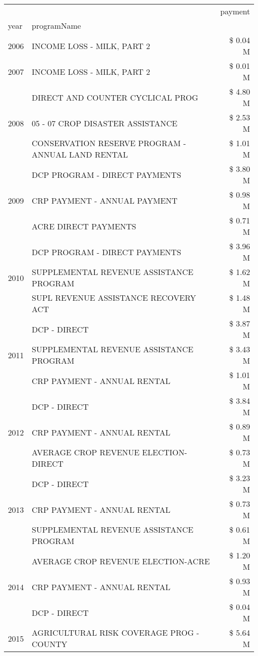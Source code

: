 \begin{tabular}{llr}
\toprule
 &  & payment \\
year & programName &  \\
\midrule
2006 & INCOME LOSS - MILK, PART 2 & \$ 0.04 M \\
\cline{1-3}
2007 & INCOME LOSS - MILK, PART 2 & \$ 0.01 M \\
\cline{1-3}
\multirow[t]{3}{*}{2008} & DIRECT AND COUNTER CYCLICAL PROG & \$ 4.80 M \\
 & 05 - 07 CROP DISASTER ASSISTANCE & \$ 2.53 M \\
 & CONSERVATION RESERVE PROGRAM - ANNUAL LAND RENTAL & \$ 1.01 M \\
\cline{1-3}
\multirow[t]{3}{*}{2009} & DCP PROGRAM - DIRECT PAYMENTS & \$ 3.80 M \\
 & CRP PAYMENT - ANNUAL PAYMENT & \$ 0.98 M \\
 & ACRE DIRECT PAYMENTS & \$ 0.71 M \\
\cline{1-3}
\multirow[t]{3}{*}{2010} & DCP PROGRAM - DIRECT PAYMENTS & \$ 3.96 M \\
 & SUPPLEMENTAL REVENUE ASSISTANCE PROGRAM & \$ 1.62 M \\
 & SUPL REVENUE ASSISTANCE RECOVERY ACT & \$ 1.48 M \\
\cline{1-3}
\multirow[t]{3}{*}{2011} & DCP - DIRECT & \$ 3.87 M \\
 & SUPPLEMENTAL REVENUE ASSISTANCE PROGRAM & \$ 3.43 M \\
 & CRP PAYMENT - ANNUAL RENTAL & \$ 1.01 M \\
\cline{1-3}
\multirow[t]{3}{*}{2012} & DCP - DIRECT & \$ 3.84 M \\
 & CRP PAYMENT - ANNUAL RENTAL & \$ 0.89 M \\
 & AVERAGE CROP REVENUE ELECTION-DIRECT & \$ 0.73 M \\
\cline{1-3}
\multirow[t]{3}{*}{2013} & DCP - DIRECT & \$ 3.23 M \\
 & CRP PAYMENT - ANNUAL RENTAL & \$ 0.73 M \\
 & SUPPLEMENTAL REVENUE ASSISTANCE PROGRAM & \$ 0.61 M \\
\cline{1-3}
\multirow[t]{3}{*}{2014} & AVERAGE CROP REVENUE ELECTION-ACRE & \$ 1.20 M \\
 & CRP PAYMENT - ANNUAL RENTAL & \$ 0.93 M \\
 & DCP - DIRECT & \$ 0.04 M \\
\cline{1-3}
\multirow[t]{3}{*}{2015} & AGRICULTURAL RISK COVERAGE PROG - COUNTY & \$ 5.64 M \\

\end{tabular}
